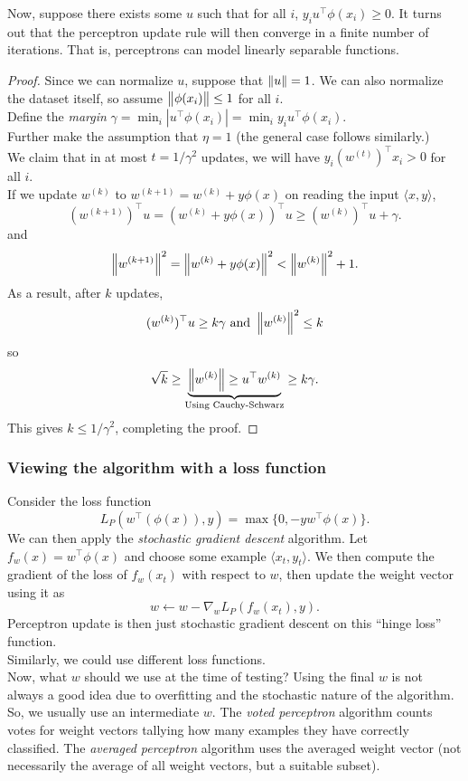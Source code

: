 \documentclass{article}
\begin{document}
			Now, suppose there exists some $u$ such that for all $i$, $y_i u^\top \phi(x_i) \ge 0$. It turns out that the perceptron update rule will then converge in a finite number of iterations. That is, perceptrons can model linearly separable functions.
			\begin{proof}
				Since we can normalize $u$, suppose that $\left\lVert u\right\rVert = 1$. We can also normalize the dataset itself, so assume $\left\lVert\phi(x_i)\right\rVert \le 1$ for all $i$. \\
				Define the \emph{margin} $\gamma = \min_i |u^\top \phi(x_i)| = \min_i y_i u^\top \phi(x_i)$.\\
				Further make the assumption that $\eta = 1$ (the general case follows similarly.) \\
				We claim that in at most $t = 1/\gamma^2$ updates, we will have $y_i (w^{(t)})^\top x_i > 0$ for all $i$.\\
				If we update $w^{(k)}$ to $w^{(k+1)} = w^{(k)} + y\phi(x)$ on reading the input $\langle x,y\rangle$,
				\[ (w^{(k+1)})^\top u =  (w^{(k)}+y\phi(x))^\top u \ge (w^{(k)})^\top u + \gamma. \]
				and
				\[ \left\lVert w^{(k+1)}\right\rVert^2 = \left\lVert w^{(k)} + y\phi(x)\right\rVert^2 < \left\lVert w^{(k)}\right\rVert^2 + 1. \]
				As a result, after $k$ updates,
				\[ (w^{(k)})^\top u \ge k\gamma \text{ and } \left\lVert w^{(k)}\right\rVert^2 \le k \]
				so
				\[ \sqrt{k} \ge \underbrace{\left\lVert w^{(k)}\right\rVert \ge u^\top w^{(k)}}_{\text{Using Cauchy-Schwarz}} \ge k\gamma. \]
				This gives $k \le 1/\gamma^2$, completing the proof.
			\end{proof}

		\subsubsection{Viewing the algorithm with a loss function}

			Consider the loss function
			\[ L_P(w^\top(\phi(x)),y) = \max\{ 0 , -yw^\top\phi(x) \}. \]
			We can then apply the \emph{stochastic gradient descent} algorithm. Let $f_w(x) = w^\top\phi(x)$ and choose some example $\langle x_t,y_t\rangle$. We then compute the gradient of the loss of $f_w(x_t)$ with respect to $w$, then update the weight vector using it as
			\[ w \gets w - \nabla_w L_P(f_w(x_t),y). \]
			Perceptron update is then just stochastic gradient descent on this ``hinge loss'' function.\\
			Similarly, we could use different loss functions.\\

			Now, what $w$ should we use at the time of testing? Using the final $w$ is not always a good idea due to overfitting and the stochastic nature of the algorithm.\\
			So, we usually use an intermediate $w$. The \emph{voted perceptron} algorithm counts votes for weight vectors tallying how many examples they have correctly classified. The \emph{averaged perceptron} algorithm uses the averaged weight vector (not necessarily the average of all weight vectors, but a suitable subset).\\
\end{document}
